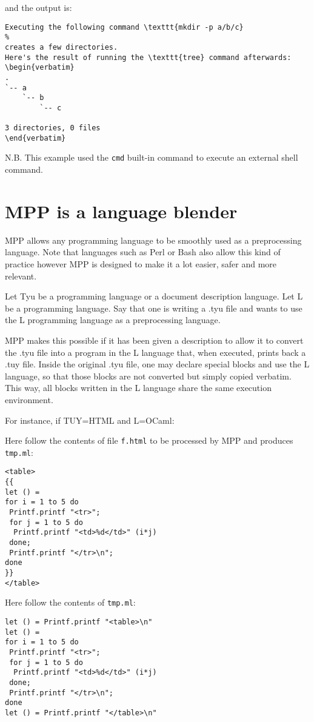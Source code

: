 \documentclass[a4paper]{article}
\begin{document}
and the output is:
\begin{lstlisting}
Executing the following command \texttt{mkdir -p a/b/c} 
% 
creates a few directories.
Here's the result of running the \texttt{tree} command afterwards:  
\begin{verbatim}
.
`-- a
    `-- b
        `-- c

3 directories, 0 files
\end{verbatim}
\end{lstlisting}
N.B. This example used the \texttt{cmd} built-in command to execute an external
shell command.

\section{MPP  is a language  blender}

MPP  allows  any  programming  language  to  be  smoothly  used  as  a
preprocessing language.  Note that languages such as Perl or Bash also
allow this kind  of practice however MPP is designed to  make it a lot
easier, safer and more relevant.

Let Tyu be a programming  language or a document description language.
Let L be a programming language.   Say that one is writing a .tyu file
and  wants  to  use  the  L programming  language  as  a  preprocessing
language. 

MPP makes this possible if it has been given a description to allow it
to convert the  .tyu file into a program in the  L language that, when
executed, prints back a .tuy  file. Inside the original .tyu file, one
may  declare special  blocks and  use the  L language,  so  that those
blocks are not converted but simply copied verbatim.
This way, all blocks written in the L language share the same execution
environment.

For instance, if TUY=HTML and L=OCaml:

Here follow the contents of file \texttt{f.html} to be processed by MPP and produces
\texttt{tmp.ml}:
\begin{lstlisting}
<table>
{{
let () = 
for i = 1 to 5 do
 Printf.printf "<tr>";
 for j = 1 to 5 do
  Printf.printf "<td>%d</td>" (i*j)
 done;
 Printf.printf "</tr>\n";
done
}}
</table>
\end{lstlisting}

Here follow the contents of \texttt{tmp.ml}:
\begin{lstlisting}
let () = Printf.printf "<table>\n"
let () = 
for i = 1 to 5 do
 Printf.printf "<tr>";
 for j = 1 to 5 do
  Printf.printf "<td>%d</td>" (i*j)
 done;
 Printf.printf "</tr>\n";
done
let () = Printf.printf "</table>\n"
\end{lstlisting}
\end{document}
